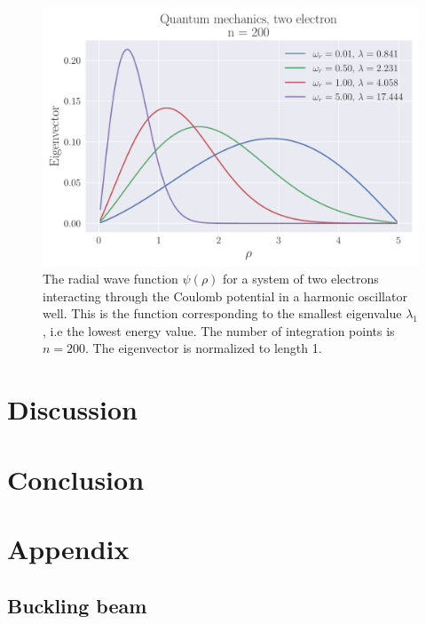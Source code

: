 \documentclass[reprint,english,notitlepage,nofootinbib]{revtex4-1}  %
\begin{document}
\begin{figure}[h]
	\centering
	\includegraphics[width=\linewidth]{../output/QM2_200.pdf}
	\caption{The radial wave function $\psi(\rho)$ for a system of two electrons interacting through the Coulomb potential in a harmonic oscillator well. This is the function corresponding to the smallest eigenvalue $\lambda_1$, i.e the lowest energy value. The number of integration points is $n = 200$. The eigenvector is normalized to length 1.}
  \label{fig:QM2002}
\end{figure}

\begin{table}
	
	\label{}
	\caption{}
\end{table}

\section{Discussion}





\section{Conclusion}

\section{Appendix}
\label{appendix}

\subsection{Buckling beam}
\end{document}
